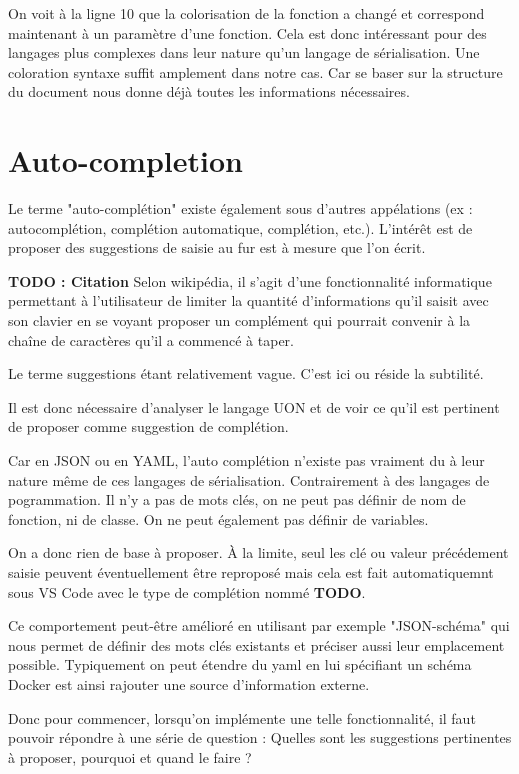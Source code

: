 \documentclass[
    iict, %
    il, %
]{heig-tb}
\begin{document}
On voit à la ligne 10 que la colorisation de la fonction a changé et correspond maintenant à un paramètre d'une fonction.
Cela est donc intéressant pour des langages plus complexes dans leur nature qu'un langage de sérialisation. Une coloration syntaxe suffit amplement dans notre cas.
Car se baser sur la structure du document nous donne déjà toutes les informations nécessaires.

\section{Auto-completion}

Le terme "auto-complétion" existe également sous d'autres appélations (ex : autocomplétion, complétion automatique, complétion, etc.).
L'intérêt est de proposer des suggestions de saisie au fur est à mesure que l'on écrit.

\textbf{TODO : Citation}
Selon wikipédia, il s'agit d'une fonctionnalité informatique permettant à l'utilisateur de limiter la quantité d'informations qu'il saisit avec son clavier
en se voyant proposer un complément qui pourrait convenir à la chaîne de caractères qu'il a commencé à taper.

Le terme suggestions étant relativement vague. C'est ici ou réside la subtilité.

Il est donc nécessaire d'analyser le langage UON et de voir ce qu'il est pertinent de proposer comme suggestion de complétion.

Car en JSON ou en YAML, l'auto complétion n'existe pas vraiment du à leur nature même de ces langages de sérialisation.
Contrairement à des langages de pogrammation. Il n'y a pas de mots clés, on ne peut pas définir de nom de fonction, ni de classe. On ne peut également pas définir de variables.

On a donc rien de base à proposer. À la limite, seul les clé ou valeur précédement saisie peuvent éventuellement être reproposé mais cela est fait automatiquemnt sous VS Code
avec le type de complétion nommé \textbf{TODO}.

Ce comportement peut-être amélioré en utilisant par exemple "JSON-schéma" qui nous permet de définir des mots clés existants et préciser aussi leur emplacement possible.
Typiquement on peut étendre du yaml en lui spécifiant un schéma Docker est ainsi rajouter une source d'information externe.


Donc pour commencer, lorsqu'on implémente une telle fonctionnalité, il faut pouvoir répondre à une série de question :
Quelles sont les suggestions pertinentes à proposer, pourquoi et quand le faire ?
\end{document}
